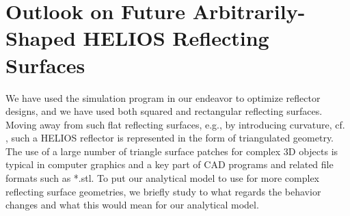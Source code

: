 \section{Outlook on Future Arbitrarily-Shaped HELIOS Reflecting Surfaces}\label{Outlook on Future Arbitrarily-Shaped HELIOS Reflecting Surfaces}
We have used the simulation program in our endeavor to optimize reflector designs, and we have used both squared and rectangular reflecting surfaces. Moving away from such flat reflecting surfaces, e.g., by introducing curvature, cf. \cite{Helios}, such a HELIOS reflector is represented in the form of triangulated geometry. The use of a large number of triangle surface patches for complex 3D objects is typical in computer graphics and a key part of CAD programs and related file formats such as *.stl. To put our analytical model to use for more complex reflecting surface geometries, we briefly study to what regards the behavior changes and what this would mean for our analytical model. 

